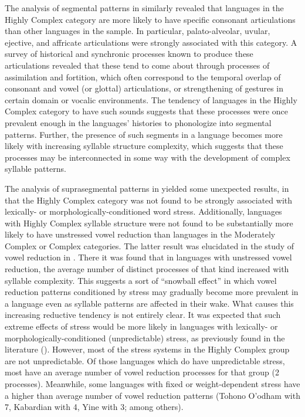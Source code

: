   The analysis of segmental patterns in  similarly revealed that languages in the Highly Complex category are more likely to have specific consonant articulations than other languages in the sample. In particular, palato-alveolar, uvular, ejective, and affricate articulations were strongly associated with this category. A survey of historical and synchronic processes known to produce these articulations revealed that these tend to come about through processes of assimilation and fortition, which often correspond to the temporal overlap of consonant and vowel (or glottal) articulations, or strengthening of gestures in certain domain or vocalic environments. The tendency of languages in the Highly Complex category to have such sounds suggests that these processes were once prevalent enough in the languages’ histories to phonologize into segmental patterns. Further, the presence of such segments in a language becomes more likely with increasing syllable structure complexity, which suggests that these processes may be interconnected in some way with the development of complex syllable patterns.

  The analysis of suprasegmental patterns in  yielded some unexpected results, in that the Highly Complex category was not found to be strongly associated with lexically- or morphologically-conditioned word stress. Additionally, languages with Highly Complex syllable structure were not found to be substantially more likely to have unstressed vowel reduction than languages in the Moderately Complex or Complex categories. The latter result was elucidated in the study of vowel reduction in . There it was found that in languages with unstressed vowel reduction, the average number of distinct processes of that kind increased with syllable complexity. This suggests a sort of ``snowball effect'' in which vowel reduction patterns conditioned by stress may gradually become more prevalent in a language even as syllable patterns are affected in their wake. What causes this increasing reductive tendency is not entirely clear. It was expected that such extreme effects of stress would be more likely in languages with lexically- or morphologically-conditioned (unpredictable) stress, as previously found in the literature (\citealt{BybeeEtAl1998,Schiering2007}). However, most of the stress systems in the Highly Complex group are not unpredictable. Of those languages which do have unpredictable stress, most have an average number of vowel reduction processes for that group (2 processes). Meanwhile, some languages with fixed or weight-dependent stress have a higher than average number of vowel reduction patterns (Tohono O’odham with 7, Kabardian with 4, Yine with 3; among others). 

